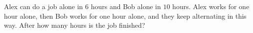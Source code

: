 Alex can do a job alone in $6$ hours and Bob alone in $10$ hours. Alex works for one hour alone, then Bob works for one hour alone, and they keep alternating in this way. After how many hours is the job finished?
